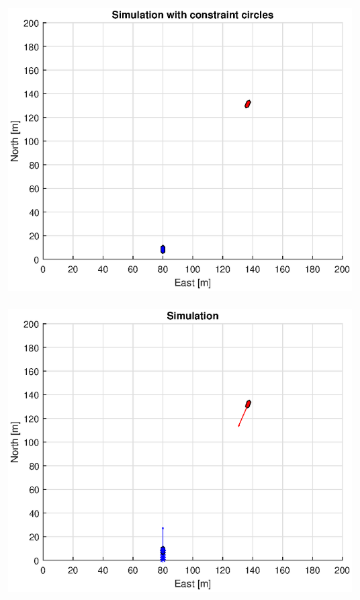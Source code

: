 
\begin{figure}[!b] %
    \begin{subfigure}[b]{0.49\textwidth}
        \centering
        \includegraphics[width=\textwidth]{Images/Figures/sving_GW/Simple1_f1_Frame1}
    \end{subfigure}
    \hfill
    \begin{subfigure}[b]{0.499\textwidth}
        \centering
        \includegraphics[width=\textwidth]{Images/Figures/sving_GW/Simple1_f600_Frame1}

\end{subfigure}
\end{figure}
